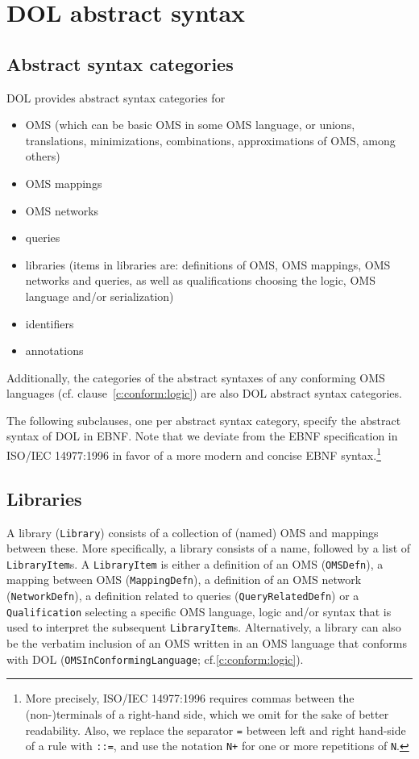 \documentclass[10pt,fleqn,%
\ifpretendfinal
final%
\else
draft%
\fi,
]{scrreprt}
\makeatletter
\newcommand{\red}[1]{#1} %
\newcommand*{\cf}{cf.\@\xspace}
\newcommand*{\termref}[1]{\index{#1}#1\xspace}
\newcommand*{\syntax}[1]{\texttt{#1}}
\newcommand*{\IS}{OMG Specification\xspace}
\newcommand{\clauserefname}{clause}
\newcommand{\cref}[1]{\clauserefname~\ref{#1}}
\newcommand{\clause}[1]{\chapter{#1}}
\newcommand{\sclause}[1]{\section{#1}}
\newcommand{\nisref}[1]{#1}
\makeatother
\begin{document}

\clause{DOL abstract syntax}\label{c:abstract-syntax}

\sclause{Abstract syntax categories}

DOL provides abstract syntax categories for
\begin{itemize}
\item \red{OMS} (which can be basic OMS in some OMS language, or unions, translations, minimizations, combinations, approximations of OMS, among others)
\item OMS mappings 
\item OMS networks
\item \red{queries}
\item libraries (items in libraries are: definitions of OMS, OMS mappings, OMS networks and queries, as well as qualifications choosing the logic,
OMS language and/or serialization)
\item identifiers
\item annotations
\end{itemize}
 
Additionally, the categories of the abstract syntaxes of any conforming OMS languages (\cf \cref{c:conform:logic}) are also DOL abstract syntax categories.

The following subclauses, one per abstract syntax category, specify the abstract syntax of DOL in EBNF. Note that we deviate from the EBNF specification in
 \nisref{ISO/IEC 14977:1996} in favor of a more modern and concise
EBNF syntax.\footnote{\red{More precisely, \nisref{ISO/IEC 14977:1996} requires commas between the (non-)terminals of a right-hand side, which we omit 
for the sake of better readability. Also, we replace the separator \syntax{=}
between left and right hand-side of a rule with \syntax{::=}, and 
use the notation \syntax{N+}
for one or more repetitions of \syntax{N}.}}  

\sclause{Libraries}\label{c:libraries}

A \termref{library} (\syntax{Library}) consists of a collection of (named)  OMS and mappings between these.  More specifically, a
library consists of a name, followed by a list of
\syntax{LibraryItem}s.  A \syntax{LibraryItem} is either a
definition of an OMS  (\syntax{OMSDefn}), 
a mapping between OMS
(\syntax{MappingDefn}), 
\red{a definition of an OMS network  (\syntax{NetworkDefn}),}
a definition related to queries 
(\syntax{QueryRelatedDefn})
or a \syntax{Qualification} selecting a specific
OMS language, logic and/or syntax that is used to interpret the
subsequent \syntax{LibraryItem}s.  Alternatively, a library can also be the verbatim inclusion of an OMS written in
an OMS language that conforms with DOL (\syntax{OMSInConformingLanguage}; \cf \ref{c:conform:logic}).
\end{document}
